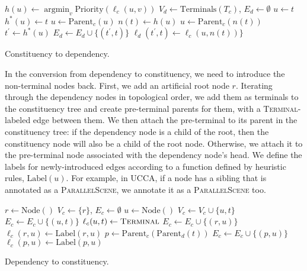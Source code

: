 \documentclass[11pt]{article}
\DeclareMathOperator*{\argmin}{argmin}
\begin{document}
\begin{algorithm}[t]
  {
  $h(u) \leftarrow \argmin_v \mathrm{Priority}(\ell_c(u,v))$\;
 }
 $V_d \leftarrow \mathrm{Terminals}({T_c})$,
 $E_d \leftarrow \emptyset$\;
  {
  $u \leftarrow t$\;
   {
  	$h^*(u) \leftarrow t$\;
  	$u \leftarrow \mathrm{Parent}_c(u)$\;
  }
  $n(t) \leftarrow h(u)$\;
 }
  {
  $u \leftarrow \mathrm{Parent}_c(n(t))$\;
  $t^\prime \leftarrow h^*(u)$\;
  $E_d \leftarrow E_d \cup \{(t^\prime, t)\}$\;
  $\ell_d (t^\prime, t) \leftarrow \ell_c(u, n(t))\}$\;
 }
 \caption{Constituency to dependency.}
 \label{alg:con2dep}
\end{algorithm}

In the conversion from dependency to constituency, we need to introduce the non-terminal nodes back.
First, we add an artificial root node $r$.
Iterating through the dependency nodes in topological order, we add them as terminals to the constituency tree and create pre-terminal parents for them, with a \textsc{Terminal}-labeled edge between them. We then attach the pre-terminal to its parent in the constituency tree: if the dependency node is a child of the root, then the constituency node will also be a child of the root node. Otherwise, we attach it to the pre-terminal node associated with the dependency node's head.
We define the labels for newly-introduced edges according to a function defined by heuristic rules, $\mathrm{Label}(u)$. For example, in UCCA, if a node has a sibling that is annotated as a \textsc{ParallelScene}, we annotate it as a \textsc{ParallelScene} too.

\begin{algorithm}
 $r \leftarrow \mathrm{Node()}$\;
 $V_c \leftarrow \{r\}$,
 $E_c \leftarrow \emptyset$\;
  {
  $u \leftarrow \mathrm{Node()}$\;
  $V_c \leftarrow V_c \cup \{u, t\}$\;
  $E_c \leftarrow E_c \cup \{(u, t)\}$\;
  $\ell_c(u,t)\leftarrow\textsc{Terminal}$\;
   {
   $E_c \leftarrow E_c \cup \{(r, u)\}$\;
   $\ell_c(r, u) \leftarrow \mathrm{Label}(r,u)$\;
  } {
   $p \leftarrow \mathrm{Parent}_c(\mathrm{Parent}_d(t))$\;
   $E_c \leftarrow E_c \cup \{(p, u)\}$\;
   $\ell_c(p, u) \leftarrow \mathrm{Label}(p,u)$\;
  }
 }
 \caption{Dependency to constituency.}
 \label{alg:dep2con}
\end{algorithm}
\end{document}
